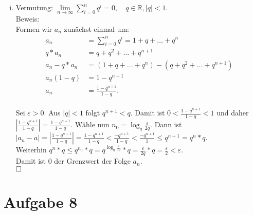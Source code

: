 \documentclass[12pt,a4paper]{article}
\newcommand{\qed}{\null\nobreak\hfill\square}
\begin{document}
\begin{enumerate}[(i)]
    \item Vermutung: $\lim\limits_{n \to \infty} \sum\limits_{i=0}^n q^i = 0,\quad q \in \mathbb{R}, |q|<1.$\\
    Beweis:\\
    Formen wir $a_n$ zunächst einmal um:\\
    \begin{align*}
        a_n &= \sum\limits_{i=0}^n q^i = 1 + q + \dots + q^n\\
        q * a_n &= q + q^2 + \dots + q^{n+1}\\
        a_n - q * a_n &= (1 + q + \dots + q^n) - (q + q^2 + \dots + q^{n+1})\\
        a_n (1 - q) &= 1 - q^{n+1}\\
        a_n &= \frac{1 - q^{n+1}}{1 - q}.
    \end{align*}\\
    Sei $\varepsilon > 0.$
    Aus $|q| < 1$ folgt $q^{n+1} < q.$
    Damit ist $0 < \frac{1 - q^{n+1}}{1-q} < 1$ und daher $|\frac{1 - q^{n+1}}{1-q}| = \frac{1 - q^{n+1}}{1-q}.$
    Wähle nun $n_0 = \log_q \frac{\varepsilon}{2q}.$
    Dann ist\\
    $|a_n - a| = |\frac{1-q^{n+1}}{1-q}| = \frac{1-q^{n+1}}{1-q} < \frac{-q^{n+1}}{1-q} < \frac{-q^{n+1}}{1} \leq q^{n+1} = q^n * q.$\\
    Weiterhin $q^n * q \leq q^{n_0} * q = q^{\log_q \frac{\varepsilon}{2q}} * q = \frac{\varepsilon}{2q} * q = \frac{\varepsilon}{2} < \varepsilon.$\\
    Damit ist $0$ der Grenzwert der Folge $a_n$.\\
    $\qed$
\end{enumerate}


\section*{Aufgabe 8}
\end{document}
